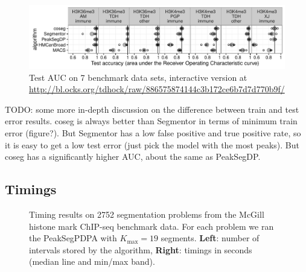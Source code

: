 \documentclass{article}
\begin{document}
\begin{figure}[b!]
  \centering
  \includegraphics[width=\textwidth]{figure-test-error-dots}
  \caption{Test AUC on 7 benchmark data sets, interactive version at \url{http://bl.ocks.org/tdhock/raw/886575874144c3b172ce6b7d7d770b9f/}}
  \label{fig:test-error-dots}
\end{figure}

TODO: some more in-depth discussion on the difference between train
and test error results. coseg is always better than Segmentor in terms
of minimum train error (figure?). But Segmentor has a low false
positive and true positive rate, so it is easy to get a low test error
(just pick the model with the most peaks). But coseg has a
significantly higher AUC, about the same as PeakSegDP.

\subsection{Timings}

\begin{figure}[b!]
  \centering
  \parbox{0.49\textwidth}{
    
  }
  \parbox{0.49\textwidth}{
    
  }
  \caption{Timing results on 2752 segmentation problems from the
    McGill histone mark ChIP-seq benchmark data. For each problem we
    ran the PeakSegPDPA with $K_{\text{max}}=19$ segments.
    \textbf{Left}: number of intervals stored by the algorithm,
    \textbf{Right}: timings in seconds (median line and min/max
    band).}
  \label{fig:timings}
\end{figure}



\end{document}
